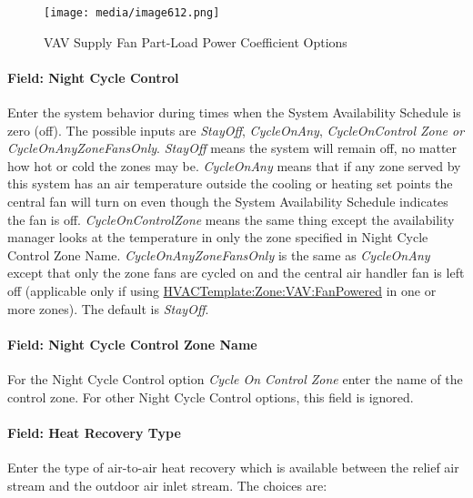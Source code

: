 \begin{figure}[hbtp] %
\centering
\texttt{[image: media/image612.png]}
\caption{VAV Supply Fan Part-Load Power Coefficient Options \protect \label{fig:vav-supply-fan-part-load-power-coefficient-001}}
\end{figure}

\paragraph{Field: Night Cycle Control}\label{field-night-cycle-control-3}

Enter the system behavior during times when the System Availability Schedule is zero (off). The possible inputs are \emph{StayOff}, \emph{CycleOnAny}, \emph{CycleOnControl Zone or CycleOnAnyZoneFansOnly}. \emph{StayOff} means the system will remain off, no matter how hot or cold the zones may be. \emph{CycleOnAny} means that if any zone served by this system has an air temperature outside the cooling or heating set points the central fan will turn on even though the System Availability Schedule indicates the fan is off. \emph{CycleOnControlZone} means the same thing except the availability manager looks at the temperature in only the zone specified in Night Cycle Control Zone Name. \emph{CycleOnAnyZoneFansOnly} is the same as \emph{CycleOnAny} except that only the zone fans are cycled on and the central air handler fan is left off (applicable only if using \hyperref[hvactemplatezonevavfanpowered]{HVACTemplate:Zone:VAV:FanPowered} in one or more zones). The default is \emph{StayOff}.

\paragraph{Field: Night Cycle Control Zone Name}\label{field-night-cycle-control-zone-name-3}

For the Night Cycle Control option \emph{Cycle On Control Zone} enter the name of the control zone. For other Night Cycle Control options, this field is ignored.

\paragraph{Field: Heat Recovery Type}\label{field-heat-recovery-type-5}

Enter the type of air-to-air heat recovery which is available between the relief air stream and the outdoor air inlet stream. The choices are:

